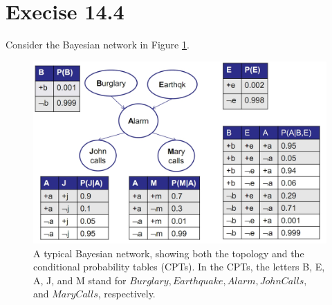 \documentclass{article}
\begin{document}
\section{Execise 14.4}
Consider the Bayesian network in Figure \ref{fig:1}.
\begin{figure}[ht]
  \centering
  \includegraphics[width=.6\textwidth]{fig14_2.jpg}
  \caption{A typical Bayesian network, showing both the topology and
    the conditional probability tables (CPTs). In the CPTs, the
    letters B, E, A, J, and M stand for $Burglary, Earthquake,
    Alarm, John Calls,$ and $MaryCalls$, respectively. 
  }
  \label{fig:1}
\end{figure}
\end{document}
